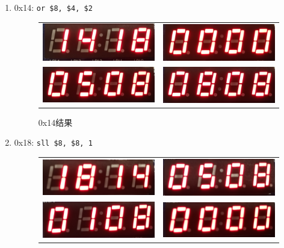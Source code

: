 \begin{enumerate}
    \item 0x14: \verb'or $8, $4, $2'
    \begin{figure}[H]
    \centering
    \begin{tabular}{cc}
    \includegraphics[width=0.3\linewidth]{fig/Implementation/0x14_00.jpg}&
    \includegraphics[width=0.3\linewidth]{fig/Implementation/0x14_01.jpg}\\
    \includegraphics[width=0.3\linewidth]{fig/Implementation/0x14_10.jpg}&
    \includegraphics[width=0.3\linewidth]{fig/Implementation/0x14_11.jpg}
    \end{tabular}
    \caption{0x14结果}
    \end{figure}
    \item 0x18: \verb'sll $8, $8, 1'
    \begin{figure}[H]
    \centering
    \begin{tabular}{cc}
    \includegraphics[width=0.3\linewidth]{fig/Implementation/0x18_00.jpg}&
    \includegraphics[width=0.3\linewidth]{fig/Implementation/0x18_01.jpg}\\
    \includegraphics[width=0.3\linewidth]{fig/Implementation/0x18_10.jpg}&
    \includegraphics[width=0.3\linewidth]{fig/Implementation/0x18_11.jpg}

\end{tabular}
\end{figure}
\end{enumerate}
